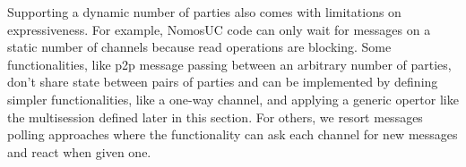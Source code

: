 Supporting a dynamic number of parties also comes with limitations on expressiveness. 
For example, NomosUC code can only wait for messages on a static number of channels because read operations are blocking. 
Some functionalities, like p2p message passing between an arbitrary number of parties, don't share state between pairs of parties and can be implemented by defining simpler functionalities, like a one-way channel, and applying a generic opertor like the multisession defined later in this section.
For others, we resort messages polling approaches where the functionality can ask each channel for new messages and react when given one. 

